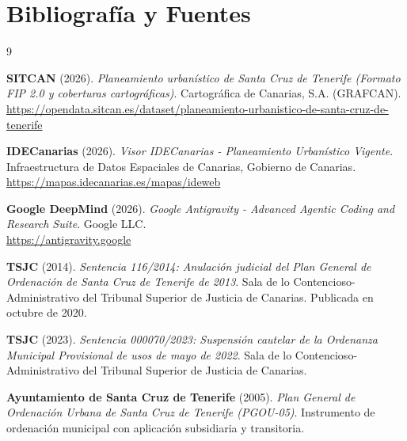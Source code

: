 \section{Bibliografía y Fuentes}

\begin{thebibliography}{9}
\sloppy

\textbf{SITCAN} (2026). \emph{Planeamiento urbanístico de Santa Cruz de Tenerife (Formato FIP 2.0 y coberturas cartográficas)}. Cartográfica de Canarias, S.A. (GRAFCAN). \\
\url{https://opendata.sitcan.es/dataset/planeamiento-urbanistico-de-santa-cruz-de-tenerife}

\textbf{IDECanarias} (2026). \emph{Visor IDECanarias - Planeamiento Urbanístico Vigente}. Infraestructura de Datos Espaciales de Canarias, Gobierno de Canarias. \\
\url{https://mapas.idecanarias.es/mapas/ideweb}

\textbf{Google DeepMind} (2026). \emph{Google Antigravity - Advanced Agentic Coding and Research Suite}. Google LLC. \\
\url{https://antigravity.google}

\textbf{TSJC} (2014). \emph{Sentencia 116/2014: Anulación judicial del Plan General de Ordenación de Santa Cruz de Tenerife de 2013}. Sala de lo Contencioso-Administrativo del Tribunal Superior de Justicia de Canarias. Publicada en octubre de 2020.

\textbf{TSJC} (2023). \emph{Sentencia 000070/2023: Suspensión cautelar de la Ordenanza Municipal Provisional de usos de mayo de 2022}. Sala de lo Contencioso-Administrativo del Tribunal Superior de Justicia de Canarias.

\textbf{Ayuntamiento de Santa Cruz de Tenerife} (2005). \emph{Plan General de Ordenación Urbana de Santa Cruz de Tenerife (PGOU-05)}. Instrumento de ordenación municipal con aplicación subsidiaria y transitoria.

\end{thebibliography}
